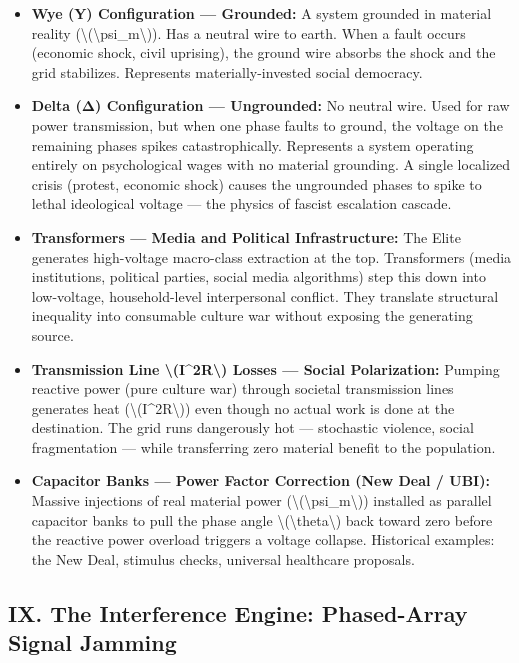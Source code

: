 {\begin{itemize}
\tightlist
\item
  \textbf{Wye (Y) Configuration --- Grounded:} A system grounded in
  material reality
  (\textbackslash(\textbackslash psi\_m\textbackslash)). Has a neutral
  wire to earth. When a fault occurs (economic shock, civil uprising),
  the ground wire absorbs the shock and the grid stabilizes. Represents
  materially-invested social democracy.
\item
  \textbf{Delta (Δ) Configuration --- Ungrounded:} No neutral wire. Used
  for raw power transmission, but when one phase faults to ground, the
  voltage on the remaining phases spikes catastrophically. Represents a
  system operating entirely on psychological wages with no material
  grounding. A single localized crisis (protest, economic shock) causes
  the ungrounded phases to spike to lethal ideological voltage --- the
  physics of fascist escalation cascade.
\item
  \textbf{Transformers --- Media and Political Infrastructure:} The
  Elite generates high-voltage macro-class extraction at the top.
  Transformers (media institutions, political parties, social media
  algorithms) step this down into low-voltage, household-level
  interpersonal conflict. They translate structural inequality into
  consumable culture war without exposing the generating source.
\item
  \textbf{Transmission Line \textbackslash(I\^{}2R\textbackslash) Losses
  --- Social Polarization:} Pumping reactive power (pure culture war)
  through societal transmission lines generates heat
  (\textbackslash(I\^{}2R\textbackslash)) even though no actual work is
  done at the destination. The grid runs dangerously hot --- stochastic
  violence, social fragmentation --- while transferring zero material
  benefit to the population.
\item
  \textbf{Capacitor Banks --- Power Factor Correction (New Deal / UBI):}
  Massive injections of real material power
  (\textbackslash(\textbackslash psi\_m\textbackslash)) installed as
  parallel capacitor banks to pull the phase angle
  \textbackslash(\textbackslash theta\textbackslash) back toward zero
  before the reactive power overload triggers a voltage collapse.
  Historical examples: the New Deal, stimulus checks, universal
  healthcare proposals.
\end{itemize}

\protect{}\label{sec-interference-engine}
\subsection{IX. The Interference Engine: Phased-Array Signal
Jamming}\label{ix.-the-interference-engine-phased-array-signal-jamming}

}
